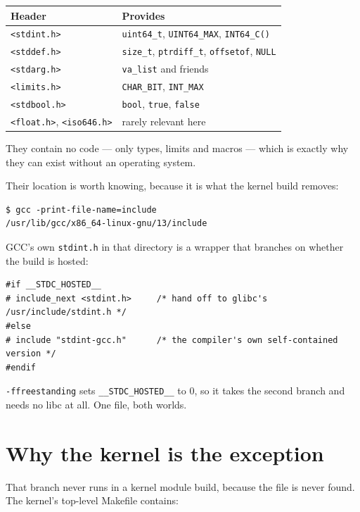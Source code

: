 \begin{center}
\begin{tabular}{ll}
  \toprule
  Header & Provides \\
  \midrule
  \lstinline|<stdint.h>|  & \lstinline|uint64_t|, \lstinline|UINT64_MAX|, \lstinline|INT64_C()| \\
  \lstinline|<stddef.h>|  & \lstinline|size_t|, \lstinline|ptrdiff_t|, \lstinline|offsetof|, \lstinline|NULL| \\
  \lstinline|<stdarg.h>|  & \lstinline|va_list| and friends \\
  \lstinline|<limits.h>|  & \lstinline|CHAR_BIT|, \lstinline|INT_MAX| \\
  \lstinline|<stdbool.h>| & \lstinline|bool|, \lstinline|true|, \lstinline|false| \\
  \lstinline|<float.h>|, \lstinline|<iso646.h>| & rarely relevant here \\
  \bottomrule
\end{tabular}
\end{center}

They contain no code --- only types, limits and macros --- which is exactly why
they can exist without an operating system.

Their location is worth knowing, because it is what the kernel build removes:

\begin{lstlisting}[style=shell]
$ gcc -print-file-name=include
/usr/lib/gcc/x86_64-linux-gnu/13/include
\end{lstlisting}

GCC's own \lstinline|stdint.h| in that directory is a wrapper that branches on
whether the build is hosted:

\begin{lstlisting}[style=c]
#if __STDC_HOSTED__
# include_next <stdint.h>     /* hand off to glibc's /usr/include/stdint.h */
#else
# include "stdint-gcc.h"      /* the compiler's own self-contained version */
#endif
\end{lstlisting}

\lstinline|-ffreestanding| sets \lstinline|__STDC_HOSTED__| to 0, so it takes
the second branch and needs no libc at all. One file, both worlds.

\section{Why the kernel is the exception}
\label{sec:kernel-nostdinc}

That branch never runs in a kernel module build, because the file is never
found. The kernel's top-level Makefile contains:

